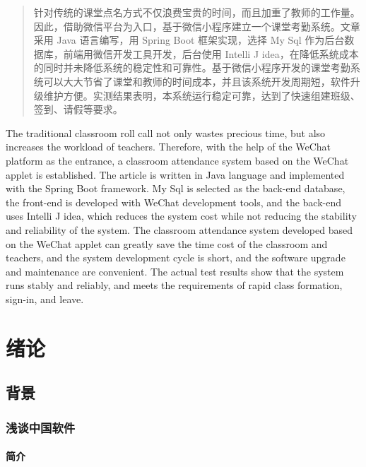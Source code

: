 \documentclass[printMode]{ecnuthesis}
\begin{document}
\frontmatter

\begin{abstract}
  针对传统的课堂点名方式不仅浪费宝贵的时间，而且加重了教师的工作量。因此，借助微信平台为入口，基于微信小程序建立一个课堂考勤系统。文章采用 Java 语言编写，用 Spring Boot 框架实现，选择 My Sql 作为后台数据库，前端用微信开发工具开发，后台使用 Intelli J idea，在降低系统成本的同时并未降低系统的稳定性和可靠性。基于微信小程序开发的课堂考勤系统可以大大节省了课堂和教师的时间成本，并且该系统开发周期短，软件升级维护方便。实测结果表明，本系统运行稳定可靠，达到了快速组建班级、签到、请假等要求。
\end{abstract}

\begin{abstractEN}
  The traditional classroom roll call not only wastes precious time, but also increases the workload of teachers. Therefore, with the help of the WeChat platform as the entrance, a classroom attendance system based on the WeChat applet is established. The article is written in Java language and implemented with the Spring Boot framework. My Sql is selected as the back-end database, the front-end is developed with WeChat development tools, and the back-end uses Intelli J idea, which reduces the system cost while not reducing the stability and reliability of the system. The classroom attendance system developed based on the WeChat applet can greatly save the time cost of the classroom and teachers, and the system development cycle is short, and the software upgrade and maintenance are convenient. The actual test results show that the system runs stably and reliably, and meets the requirements of rapid class formation, sign-in, and leave.
\end{abstractEN}

\mainmatter

\chapter{绪论}
\section{背景}
\subsection{浅谈中国软件}
\subsubsection{简介}
\end{document}
